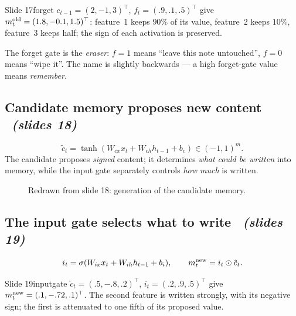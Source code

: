 \documentclass[11pt,a4paper]{article}
\newcommand{\tc}{\tilde c}
\newcommand{\sltag}[1]{\texorpdfstring{\ \emph{(slides #1)}}{ (slides #1)}}
\begin{document}
\begin{example}{Slide 17}{forget}
$c_{t-1}=(2,-1,3)^\top$, $f_t=(.9,.1,.5)^\top$ give $m_t^{\rm old}=(1.8,-0.1,1.5)^\top$: feature~1 keeps $90\%$ of its value, feature~2 keeps $10\%$, feature~3 keeps half; the sign of each activation is preserved.
\end{example}

\begin{intuition}
The forget gate is the \emph{eraser}: $f=1$ means ``leave this note untouched'', $f=0$ means ``wipe it''. The name is slightly backwards --- a high forget-gate value means \emph{remember}.
\end{intuition}

\subsection{Candidate memory proposes new content \sltag{18}}

\[
\tc_t=\tanh(W_{cx}x_t+W_{ch}h_{t-1}+b_c)\in(-1,1)^m .
\]
The candidate proposes \emph{signed} content; it determines \emph{what could be written} into memory, while the input gate separately controls \emph{how much} is written.

\begin{figure}[H]\centering
{}
\caption{Redrawn from slide 18: generation of the candidate memory.}
\end{figure}

\subsection{The input gate selects what to write \sltag{19}}

\[
i_t=\sigma(W_{ix}x_t+W_{ih}h_{t-1}+b_i),\qquad m_t^{\rm new}=i_t\odot\tc_t .
\]
\begin{example}{Slide 19}{inputgate}
$\tc_t=(.5,-.8,.2)^\top$, $i_t=(.2,.9,.5)^\top$ give $m_t^{\rm new}=(.1,-.72,.1)^\top$. The second feature is written strongly, with its negative sign; the first is attenuated to one fifth of its proposed value.
\end{example}
\end{document}
